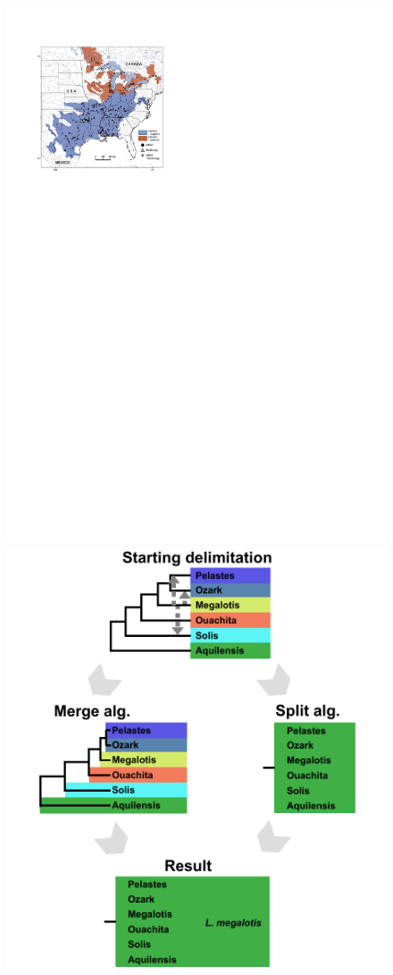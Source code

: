 \documentclass[A4]{article1}
\begin{document}
\begin{figure}[t]
    \centering %
    \includegraphics[scale=0.4]{figs/fig-longear-fish-map}
    \includegraphics[scale=0.2]{figs/fig-longear-fish-results}
    

\end{figure}
\end{document}
